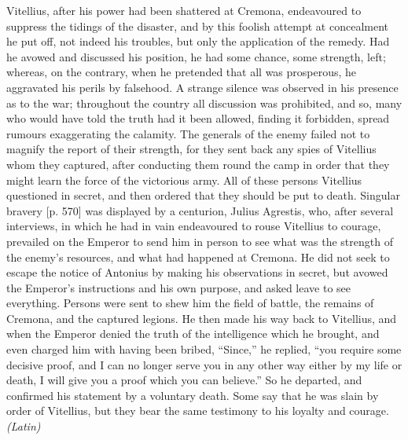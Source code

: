 
Vitellius, after his power had been shattered at Cremona, endeavoured to suppress the tidings of the disaster, and by this foolish attempt at concealment he put off, not indeed his troubles, but only the application of the remedy. Had he avowed and discussed his position, he had some chance, some strength, left; whereas, on the contrary, when he pretended that all was prosperous, he aggravated his perils by falsehood. A strange silence was observed in his presence as to the war; throughout the country all discussion was prohibited, and so, many who would have told the truth had it been allowed, finding it forbidden, spread rumours exaggerating the calamity. The generals of the enemy failed not to magnify the report of their strength, for they sent back any spies of Vitellius whom they captured, after conducting them round the camp in order that they might learn the force of the victorious army. All of these persons Vitellius questioned in secret, and then ordered that they should be put to death. Singular bravery [p. 570] was displayed by a centurion, Julius Agrestis, who, after several interviews, in which he had in vain endeavoured to rouse Vitellius to courage, prevailed on the Emperor to send him in person to see what was the strength of the enemy's resources, and what had happened at Cremona. He did not seek to escape the notice of Antonius by making his observations in secret, but avowed the Emperor's instructions and his own purpose, and asked leave to see everything. Persons were sent to shew him the field of battle, the remains of Cremona, and the captured legions. He then made his way back to Vitellius, and when the Emperor denied the truth of the intelligence which he brought, and even charged him with having been bribed, ``Since,'' he replied, ``you require some decisive proof, and I can no longer serve you in any other way either by my life or death, I will give you a proof which you can believe.'' So he departed, and confirmed his statement by a voluntary death. Some say that he was slain by order of Vitellius, but they bear the same testimony to his loyalty and courage. \emph{(Latin)}


